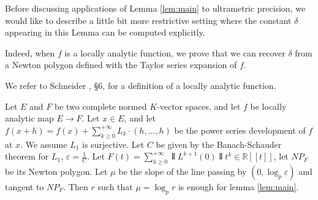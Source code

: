 \documentclass{lms}
\begin{document}

Before discussing applications of Lemma \ref{lem:main} to ultrametric 
precision, we would like to describe a little bit more restrictive 
setting where the constant $\delta$ appearing in this Lemma can be 
computed explicitly.


Indeed, when $f$ is a locally analytic function, we prove that we can recover $\delta$ from a Newton polygon defined with the Taylor series expansion of $f.$

We refer to Schneider \cite{Schneider}, \S 6, for a definition of a 
locally analytic function.


\begin{prop}\label{prop:locanalytic}
Let $E$ and $F$ be two complete normed $K$-vector spaces, and let $f$ be locally analytic map $E \rightarrow F$.  Let $x \in E$, and let $f(x+h)=f(x)+\sum_{k \geq 0}^{+\infty} L_k \cdot (h,\dots,h)$ be the power series development of $f$ at $x$. We assume $L_1$ is surjective. 
Let $C$ be given by the Banach-Schauder theorem for $L_1$, $\varepsilon = \frac{1}{C}$. 
Let $F(t) = \sum_{k\geq 0}^{+\infty} \interleave L^{k+1}(0) \interleave  t^k \in \mathbb{R}[[t]]$, let $NP_F$ be its Newton polygon.
Let $\mu$ be the slope of the line passing by $(0, \log_p \varepsilon)$ and tangent to $NP_F$.
Then $r$ such that $\mu=\log_p r$ is enough for lemma \ref{lem:main}.
\end{prop}
\end{document}
